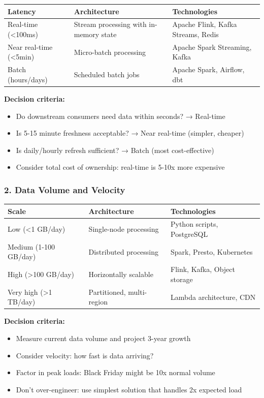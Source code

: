 \begin{tabular}{|p{3cm}|p{5cm}|p{5cm}|}
\hline
\textbf{Latency} & \textbf{Architecture} & \textbf{Technologies} \\
\hline
Real-time (<100ms) & Stream processing with in-memory state & Apache Flink, Kafka Streams, Redis \\
\hline
Near real-time (<5min) & Micro-batch processing & Apache Spark Streaming, Kafka \\
\hline
Batch (hours/days) & Scheduled batch jobs & Apache Spark, Airflow, dbt \\
\hline
\end{tabular}

\textbf{Decision criteria:}
\begin{itemize}
    \item Do downstream consumers need data within seconds? → Real-time
    \item Is 5-15 minute freshness acceptable? → Near real-time (simpler, cheaper)
    \item Is daily/hourly refresh sufficient? → Batch (most cost-effective)
    \item Consider total cost of ownership: real-time is 5-10x more expensive
\end{itemize}

\subsubsection{2. Data Volume and Velocity}

\begin{tabular}{|p{3cm}|p{5cm}|p{5cm}|}
\hline
\textbf{Scale} & \textbf{Architecture} & \textbf{Technologies} \\
\hline
Low (<1 GB/day) & Single-node processing & Python scripts, PostgreSQL \\
\hline
Medium (1-100 GB/day) & Distributed processing & Spark, Presto, Kubernetes \\
\hline
High (>100 GB/day) & Horizontally scalable & Flink, Kafka, Object storage \\
\hline
Very high (>1 TB/day) & Partitioned, multi-region & Lambda architecture, CDN \\
\hline
\end{tabular}

\textbf{Decision criteria:}
\begin{itemize}
    \item Measure current data volume and project 3-year growth
    \item Consider velocity: how fast is data arriving?
    \item Factor in peak loads: Black Friday might be 10x normal volume
    \item Don't over-engineer: use simplest solution that handles 2x expected load
\end{itemize}

